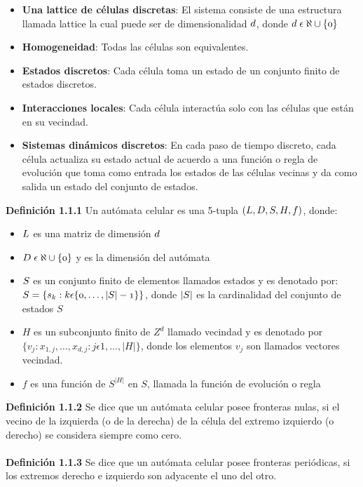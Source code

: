 \begin{itemize}
	\item{\textbf{Una lattice de células discretas}: El sistema consiste de una estructura llamada lattice la cual puede ser de dimensionalidad  $\mathnormal{d}$, donde $\mathnormal{d\; \epsilon\; \aleph\cup\{0\}}$}
	\item{\textbf{Homogeneidad}: Todas las células son equivalentes.}
	\item{\textbf{Estados discretos}: Cada célula toma un estado de un conjunto finito de estados discretos.}
	\item{\textbf{Interacciones locales}: Cada célula interactúa solo con las células que están en su vecindad.}
	\item{\textbf{Sistemas dinámicos discretos}: En cada paso de tiempo discreto, cada célula actualiza su estado actual de acuerdo a una función o regla de evolución que toma como entrada los estados de las células vecinas y da como salida un estado del conjunto de estados.}
\end{itemize}

\textbf{Definición 1.1.1} Un autómata celular es una 5-tupla $\mathnormal{(L, D, S, H, f)}$, donde:
\begin{itemize}
	\item $\mathnormal{L}$ es una matriz de dimensión $\mathnormal{d}$
	\item $\mathnormal{D\; \epsilon\; \aleph\cup\{0\}}$ y es la dimensión del autómata
	\item $\mathnormal{S}$ es un conjunto finito de elementos llamados estados y es denotado por:
	\\
	$\mathnormal{S=\{s_{k}:k \epsilon \{0,\dots,|S|-1\}\}}$, donde $\mathnormal{|S|}$ es la cardinalidad del conjunto de estados $S$
	\item $H$ es un subconjunto finito de $Z^{d}$ llamado vecindad y es denotado por $\{v_{j}:x_{1,j},\dots,x_{d,j}:j\epsilon1,\dots,|H|\}$, donde los elementos $v_{j}$ son llamados vectores vecindad.
	\item $f$ es una función de $S^{|H|}$ en $S$, llamada la función de evolución o regla
\end{itemize}
\textbf{Definición 1.1.2} Se dice que un autómata celular posee fronteras nulas, si el vecino de la izquierda (o de la derecha) de la célula del extremo izquierdo (o derecho) se considera siempre como cero.
\\
\\
\textbf{Definición 1.1.3} Se dice que un autómata celular posee fronteras periódicas, si los extremos derecho e izquierdo son adyacente el uno del otro.

